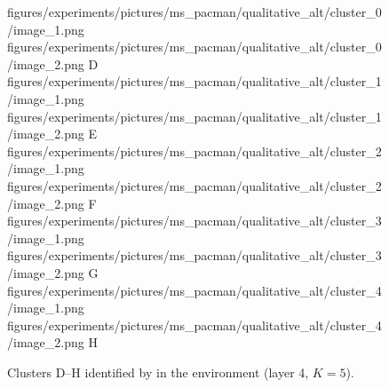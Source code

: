 \begin{figure}[H]
    \qualitativeClusterFigureSetup
    \qualitativeClusterTwo
        {figures/experiments/pictures/ms_pacman/qualitative_alt/cluster_0/image_1.png}
        {figures/experiments/pictures/ms_pacman/qualitative_alt/cluster_0/image_2.png}
        {D}
    \qualitativeClusterTwo
        {figures/experiments/pictures/ms_pacman/qualitative_alt/cluster_1/image_1.png}
        {figures/experiments/pictures/ms_pacman/qualitative_alt/cluster_1/image_2.png}
        {E}
    \qualitativeClusterTwo
        {figures/experiments/pictures/ms_pacman/qualitative_alt/cluster_2/image_1.png}
        {figures/experiments/pictures/ms_pacman/qualitative_alt/cluster_2/image_2.png}
        {F}
    \qualitativeClusterTwo
        {figures/experiments/pictures/ms_pacman/qualitative_alt/cluster_3/image_1.png}
        {figures/experiments/pictures/ms_pacman/qualitative_alt/cluster_3/image_2.png}
        {G}
    \qualitativeClusterTwo
        {figures/experiments/pictures/ms_pacman/qualitative_alt/cluster_4/image_1.png}
        {figures/experiments/pictures/ms_pacman/qualitative_alt/cluster_4/image_2.png}
        {H}
    \caption{Clusters D--H identified by  in the \MsPacManName environment (layer 4, $K=5$).}
    \label{fig:qualitative_ms_pacman_alt}
\end{figure}
